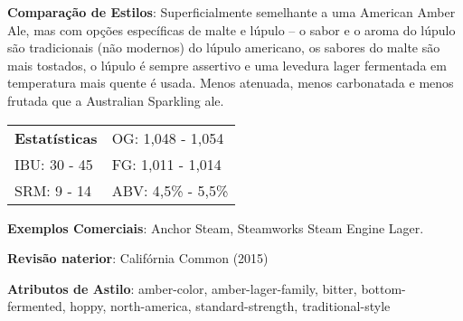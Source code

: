 \textbf{Comparação de Estilos}: Superficialmente semelhante a uma American Amber Ale, mas com opções específicas de malte e lúpulo – o sabor e o aroma do lúpulo são tradicionais (não modernos) do lúpulo americano, os sabores do malte são mais tostados, o lúpulo é sempre assertivo e uma levedura lager fermentada em temperatura mais quente é usada. Menos atenuada, menos carbonatada e menos frutada que a Australian Sparkling ale.

\begin{tabular}{@{}p{35mm}p{35mm}@{}}
  \textbf{Estatísticas} & OG: 1,048 - 1,054 \\
  IBU: 30 - 45  & FG: 1,011 - 1,014  \\
  SRM: 9 - 14  & ABV: 4,5\% - 5,5\%
\end{tabular}

\textbf{Exemplos Comerciais}: Anchor Steam, Steamworks Steam Engine Lager.

\textbf{Revisão naterior}: Califórnia Common (2015)

\textbf{Atributos de Astilo}: amber-color, amber-lager-family, bitter, bottom-fermented, hoppy, north-america, standard-strength, traditional-style
